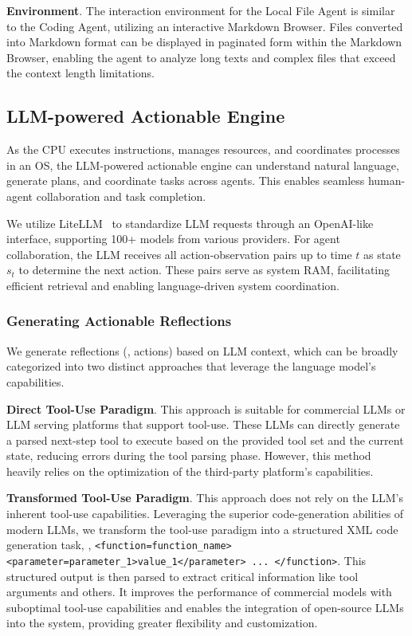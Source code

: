 \noindent \textbf{Environment}. The interaction environment for the Local File Agent is similar to the Coding Agent, utilizing an interactive Markdown Browser. Files converted into Markdown format can be displayed in paginated form within the Markdown Browser, enabling the agent to analyze long texts and complex files that exceed the context length limitations.

\subsection{LLM-powered Actionable Engine}
As the CPU executes instructions, manages resources, and coordinates processes in an OS, the LLM-powered actionable engine can understand natural language, generate plans, and coordinate tasks across agents. This enables seamless human-agent collaboration and task completion.

We utilize LiteLLM~\cite{berriai2023litellm} to standardize LLM requests through an OpenAI-like interface, supporting 100+ models from various providers. For agent collaboration, the LLM receives all action-observation pairs up to time \(t\) as state \(s_t\) to determine the next action. These pairs serve as system RAM, facilitating efficient retrieval and enabling language-driven system coordination.

\subsubsection{Generating Actionable Reflections}
We generate reflections (\ie, actions) based on LLM context, which can be broadly categorized into two distinct approaches that leverage the language model's capabilities.

\noindent \textbf{Direct Tool-Use Paradigm}. This approach is suitable for commercial LLMs or LLM serving platforms that support tool-use. These LLMs can directly generate a parsed next-step tool to execute based on the provided tool set and the current state, reducing errors during the tool parsing phase. However, this method heavily relies on the optimization of the third-party platform's capabilities.

\noindent \textbf{Transformed Tool-Use Paradigm}. This approach does not rely on the LLM's inherent tool-use capabilities. Leveraging the superior code-generation abilities of modern LLMs, we transform the tool-use paradigm into a structured XML code generation task, \eg, \texttt{<function=function\_name> <parameter=parameter\_1>value\_1</parameter> ... </function>}. This structured output is then parsed to extract critical information like tool arguments and others. It improves the performance of commercial models with suboptimal tool-use capabilities and enables the integration of open-source LLMs into the system, providing greater flexibility and customization.

